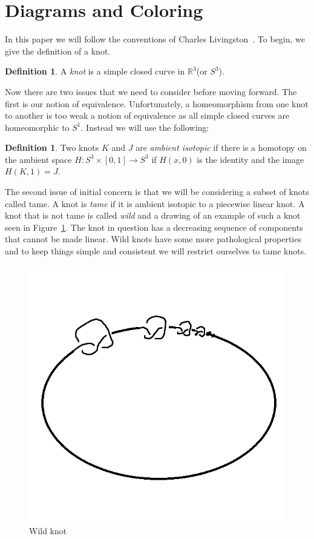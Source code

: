 \documentclass[12pt]{amsart}
\theoremstyle{definition}
\newtheorem{definition}[theorem]{Definition}
\theoremstyle{remark}
\numberwithin{equation}{section}
\newcommand{\bb}[1]{\mathbb{#1}}
\newcommand{\ds}{.3}
\begin{document}
\section{Diagrams and Coloring}
\label{sec:diagrams-coloring}

In this paper we will follow the conventions of Charles
Livingston~\cite{Livingston}. To begin, we give the definition of a knot.

\begin{definition}
  A \textit{knot} is a simple closed curve in $\bb{R}^3$(or $S^3$).
\end{definition}

Now there are two issues that we need to consider before moving forward.
The first is our notion of equivalence. Unfortunately, a homeomorphism from
one knot to another is too weak a notion of equivalence as all simple closed curves
are homeomorphic to $S^1$. Instead we will use the following: 

\begin{definition}
  Two knots $K$ and $J$ are \textit{ambient isotopic} if there is a homotopy on the ambient
  space $H:S^3\times [0,1]\rightarrow S^3$ if $H(x,0)$ is the identity and the
  image $H(K,1)=J$.
\end{definition}

The second issue of initial concern is that we will be considering a subset of knots called tame. A knot
is \textit{tame} if it is ambient isotopic to a piecewise linear knot. A
knot that is not tame is called \textit{wild} and a drawing of an example of such a knot
seen in Figure~\ref{fig:wild}. The knot in question has a decreasing sequence of
components that cannot be made linear. Wild knots have some more pathological
properties and to keep things simple and consistent we will restrict ourselves to
tame knots.

\begin{figure}
  \includegraphics[scale=\ds]{wild}
  \caption{Wild knot}
  \label{fig:wild}
\end{figure}
\end{document}
